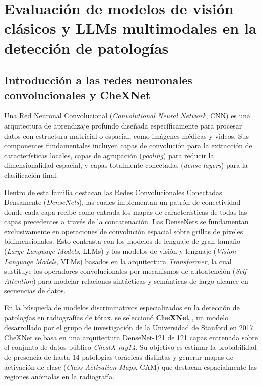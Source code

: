 \documentclass[../tesis.tex]{subfiles}
\begin{document}
\graphicspath{{../imagenes/}{imagenes/}}

\chapter{Evaluación de modelos de visión clásicos y LLMs multimodales en la detección de patologías}

\section{Introducción a las redes neuronales convolucionales y CheXNet}
\label{sec:intro_cnn_chexnet}

Una Red Neuronal Convolucional (\textit{Convolutional Neural Network}, CNN) es una arquitectura de aprendizaje profundo diseñada específicamente para procesar datos con estructura matricial o espacial, como imágenes médicas y videos. Sus componentes fundamentales incluyen capas de convolución para la extracción de características locales, capas de agrupación (\textit{pooling}) para reducir la dimensionalidad espacial, y capas totalmente conectadas (\textit{dense layers}) para la clasificación final.

Dentro de esta familia destacan las Redes Convolucionales Conectadas Densamente (\textit{DenseNets}), las cuales implementan un patrón de conectividad donde cada capa recibe como entrada los mapas de características de todas las capas precedentes a través de la concatenación. Las DenseNets se fundamentan exclusivamente en operaciones de convolución espacial sobre grillas de píxeles bidimensionales. Esto contrasta con los modelos de lenguaje de gran tamaño (\textit{Large Language Models}, LLMs) y los modelos de visión y lenguaje (\textit{Vision-Language Models}, VLMs) basados en la arquitectura \textit{Transformer}, la cual sustituye los operadores convolucionales por mecanismos de autoatención (\textit{Self-Attention}) para modelar relaciones sintácticas y semánticas de largo alcance en secuencias de datos.

En la búsqueda de modelos discriminativos especializados en la detección de patologías en radiografías de tórax, se seleccionó \textbf{CheXNet} \citep{rajpurkar2017chexnet}, un modelo desarrollado por el grupo de investigación de la Universidad de Stanford en 2017. CheXNet se basa en una arquitectura DenseNet-121 de 121 capas entrenada sobre el conjunto de datos público \textit{ChestX-ray14}. Su objetivo es estimar la probabilidad de presencia de hasta 14 patologías torácicas distintas y generar mapas de activación de clase (\textit{Class Activation Maps}, CAM) que destacan espacialmente las regiones anómalas en la radiografía.
\end{document}
